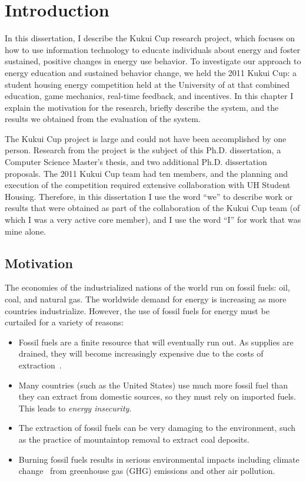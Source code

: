 \chapter{Introduction}

In this dissertation, I describe the Kukui Cup research project, which focuses on how to use information technology to educate individuals about energy and foster sustained, positive changes in energy use behavior. To investigate our approach to energy education and sustained behavior change, we held the 2011 Kukui Cup: a student housing energy competition held at the University of \Hawaii at \Manoa that combined education, game mechanics, real-time feedback, and incentives. In this chapter I explain the motivation for the research, briefly describe the system, and the results we obtained from the evaluation of the system.

The Kukui Cup project is large and could not have been accomplished by one person. Research from the project is the subject of this Ph.D. dissertation, a Computer Science Master's thesis, and two additional Ph.D. dissertation proposals. The 2011 Kukui Cup team had ten members, and the planning and execution of the competition required extensive collaboration with UH \Manoa Student Housing. Therefore, in this dissertation I use the word ``we'' to describe work or results that were obtained as part of the collaboration of the Kukui Cup team (of which I was a very active core member), and I use the word ``I'' for work that was mine alone.


\section{Motivation}

The economies of the industrialized nations of the world run on fossil fuels: oil, coal, and natural gas. The worldwide demand for energy is increasing as more countries industrialize. However, the use of fossil fuels for energy must be curtailed for a variety of reasons:

\begin{itemize}
	\item Fossil fuels are a finite resource that will eventually run out. As supplies are drained, they will become increasingly expensive due to the costs of extraction~\cite{Murray2012Climate-policy}.
	\item Many countries (such as the United States) use much more fossil fuel than they can extract from domestic sources, so they must rely on imported fuels. This leads to \emph{energy insecurity}.
	\item The extraction of fossil fuels can be very damaging to the environment, such as the practice of mountaintop removal to extract coal deposits.
	\item Burning fossil fuels results in serious environmental impacts including climate change~\cite{IPCC-synthesis-report-2007} from greenhouse gas (GHG) emissions and other air pollution.
\end{itemize}

